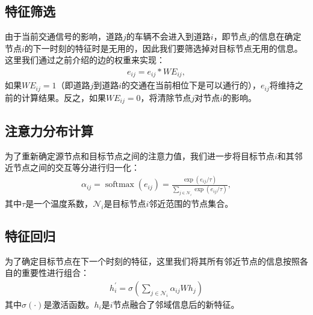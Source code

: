 \subsection{特征筛选}
由于当前交通信号的影响，道路$j$的车辆不会进入到道路$i$，即节点$j$的信息在确定节点$i$的下一时刻的特征时是无用的，因此我们要筛选掉对目标节点无用的信息。这里我们通过之前介绍的边的权重来实现：
\begin{align}
  \label{eq:mul_phase}
  e_{i j} = e_{i j} * WE_{i j},
\end{align}
如果$WE_{i j} = 1$（即道路$j$到道路$i$的交通在当前相位下是可以通行的），$e_{ij}$将维持之前的计算结果。反之，如果$WE_{i j}=0$，将清除节点$j$对节点$i$的影响。
\subsection{注意力分布计算}
为了重新确定源节点和目标节点之间的注意力值，我们进一步将目标节点$i$和其邻近节点之间的交互等分进行归一化：
\begin{align}
  \alpha_{i j}=\operatorname{softmax}\left(e_{i j}\right)=\frac{\exp \left(e_{i j} / \tau\right)}{\sum_{j \in \mathcal{N}_{i}} \exp \left(e_{i j} / \tau\right)},
\end{align}
其中$\tau$是一个温度系数，$\mathcal{N}_{i}$是目标节点$i$邻近范围的节点集合。
\subsection{特征回归}
为了确定目标节点在下一个时刻的特征，这里我们将其所有邻近节点的信息按照各自的重要性进行组合：
\begin{align}
  h_{i}^{\prime}=\sigma\left(\sum_{j \in \mathcal{N}_{i}} \alpha_{i j} W h_{j}\right)
\end{align}
其中$\sigma(\cdot)$是激活函数。$h_{i}$是$i$节点融合了邻域信息后的新特征。

